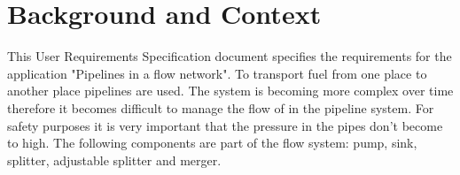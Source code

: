\documentclass[12pt]{report}
\begin{document}

\restoregeometry 
\nopagecolor

\begingroup
\let\cleardoublepage\relax
\let\clearpage\relax
\section*{Background and Context}
This User Requirements Specification document specifies the requirements for the application "Pipelines in a flow network". To transport fuel from one place to another place pipelines are used. The  system is becoming more complex over time therefore it becomes difficult to manage the flow of in the pipeline system. For safety purposes it is very important that the pressure in the pipes don't become to high. The following components are part of the flow system: pump, sink, splitter, adjustable splitter and merger.

\tableofcontents
\endgroup




\end{document}
